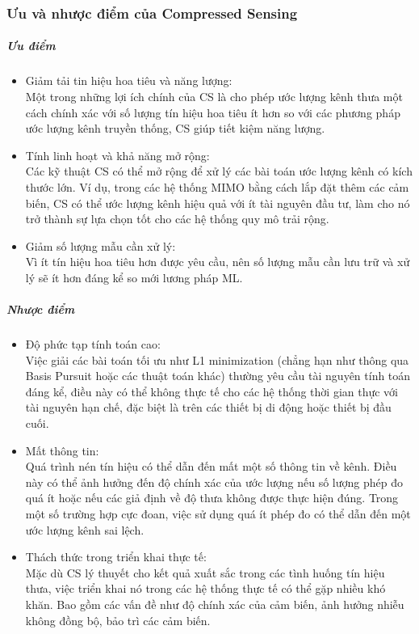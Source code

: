 \documentclass{article}
\begin{document}
\subsubsection{Ưu và nhược điểm của Compressed Sensing}
\subparagraph{Ưu điểm}
\begin{itemize}
\item Giảm tải tin hiệu hoa tiêu và năng lượng:\\
Một trong những lợi ích chính của CS là cho phép ước lượng kênh thưa một cách chính xác với số lượng tín hiệu hoa tiêu ít hơn so với các phương pháp ước lượng kênh truyền thống, CS giúp tiết kiệm năng lượng. 

\item Tính linh hoạt và khả năng mở rộng:\\
Các kỹ thuật CS có thể mở rộng để xử lý các bài toán ước lượng kênh có kích thước lớn. Ví dụ, trong các hệ thống MIMO bằng cách lắp đặt thêm các cảm biến, CS có thể ước lượng kênh hiệu quả với ít tài nguyên đầu tư, làm cho nó trở thành sự lựa chọn tốt cho các hệ thống quy mô trải rộng.

\item Giảm số lượng mẫu cần xử lý:\\
Vì ít tín hiệu hoa tiêu hơn được yêu cầu, nên số lượng mẫu cần lưu trữ và xử lý sẽ ít hơn đáng kể so mới lương pháp ML.
\end{itemize}

\subparagraph{Nhược điểm}
\begin{itemize}
\item Độ phức tạp tính toán cao:\\
Việc giải các bài toán tối ưu như L1 minimization (chẳng hạn như thông qua Basis Pursuit hoặc các thuật toán khác) thường yêu cầu tài nguyên tính toán đáng kể, điều này có thể không thực tế cho các hệ thống thời gian thực với tài nguyên hạn chế, đặc biệt là trên các thiết bị di động hoặc thiết bị đầu cuối.

\item Mất thông tin:\\
Quá trình nén tín hiệu có thể dẫn đến mất một số thông tin về kênh. Điều này có thể ảnh hưởng đến độ chính xác của ước lượng nếu số lượng phép đo quá ít hoặc nếu các giả định về độ thưa không được thực hiện đúng. Trong một số trường hợp cực đoan, việc sử dụng quá ít phép đo có thể dẫn đến một ước lượng kênh sai lệch.

\item Thách thức trong triển khai thực tế:\\
Mặc dù CS lý thuyết cho kết quả xuất sắc trong các tình huống tín hiệu thưa, việc triển khai nó trong các hệ thống thực tế có thể gặp nhiều khó khăn. Bao gồm các vấn đề như độ chính xác của cảm biến, ảnh hưởng nhiễu không đồng bộ, bảo trì các cảm biến.

\end{itemize}
\end{document}
